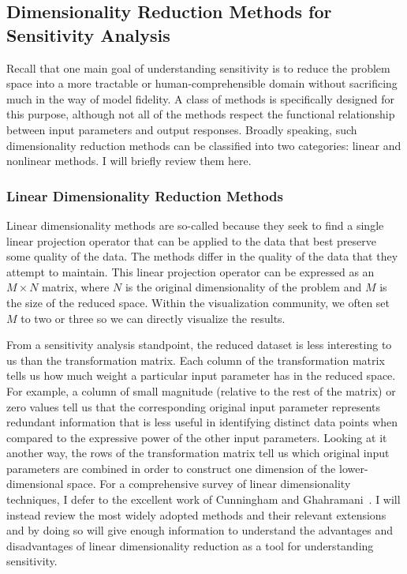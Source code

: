 \subsection{Dimensionality Reduction Methods for Sensitivity Analysis}

Recall that one main goal of understanding sensitivity is to reduce the problem space into a more tractable or human-comprehensible domain without sacrificing much in the way of model fidelity.
%
A class of methods is specifically designed for this purpose, although not all of the methods respect the functional relationship between input parameters and output responses.
%
Broadly speaking, such dimensionality reduction methods can be classified into two categories: linear and nonlinear methods.
%
I will briefly review them here.

\subsubsection{Linear Dimensionality Reduction Methods}

Linear dimensionality methods are so-called because they seek to find a single linear projection operator that can be applied to the data that best preserve some quality of the data.
%
The methods differ in the quality of the data that they attempt to maintain.
%
This linear projection operator can be expressed as an $M \times N$ matrix, where $N$ is the original dimensionality of the problem and $M$ is the size of the reduced space.
%
Within the visualization community, we often set $M$ to two or three so we can directly visualize the results.

From a sensitivity analysis standpoint, the reduced dataset is less interesting to us than the transformation matrix.
%
Each column of the transformation matrix tells us how much weight a particular input parameter has in the reduced space.
%
For example, a column of small magnitude (relative to the rest of the matrix) or zero values tell us that the corresponding original input parameter represents redundant information that is less useful in identifying distinct data points when compared to the expressive power of the other input parameters.
%
Looking at it another way, the rows of the transformation matrix tell us which original input parameters are combined in order to construct one dimension of the lower-dimensional space.
%
For a comprehensive survey of linear dimensionality techniques, I defer to the excellent work of Cunningham and Ghahramani~\cite{CunninghamGhahramani2015}.
%
I will instead review the most widely adopted methods and their relevant extensions and by doing so will give enough information to understand the advantages and disadvantages of linear dimensionality reduction as a tool for understanding sensitivity.

